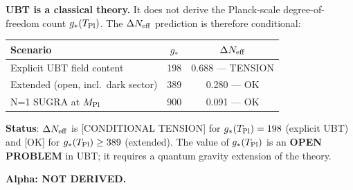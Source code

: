 \documentclass[12pt,a4paper]{article}
\begin{document}
\begin{tcolorbox}[colback=yellow!5!white, colframe=orange!60!black,
  title={$\Delta N_{\rm eff}$ Final Verdict (2026-05-19) ---
         \textbf{[CONDITIONAL TENSION]}}]

\textbf{UBT is a classical theory.} It does not derive the
Planck-scale degree-of-freedom count $g_*(T_{\rm Pl})$.
The $\Delta N_{\rm eff}$ prediction is therefore conditional:

\begin{center}\begin{tabular}{lcc}
\toprule
Scenario & $g_*$ & $\Delta N_{\rm eff}$ \\
\midrule
Explicit UBT field content & 198 & 0.688 --- TENSION \\
Extended (open, incl.\ dark sector) & 389 & 0.280 --- OK \\
N=1 SUGRA at $M_{\rm Pl}$ & 900 & 0.091 --- OK \\
\bottomrule
\end{tabular}\end{center}

\textbf{Status}: $\Delta N_{\rm eff}$ is [CONDITIONAL TENSION]
for $g_*(T_{\rm Pl}) = 198$ (explicit UBT) and [OK] for
$g_*(T_{\rm Pl})\ge 389$ (extended).
The value of $g_*(T_{\rm Pl})$ is an \textbf{OPEN PROBLEM}
in UBT; it requires a quantum gravity extension of the theory.

\textbf{Alpha: NOT DERIVED.}
\end{tcolorbox}
\end{document}
